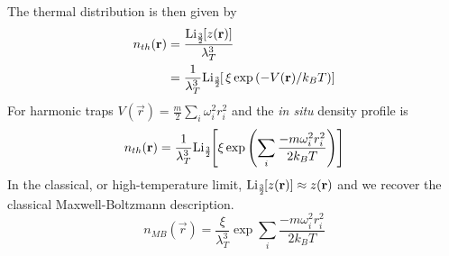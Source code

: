 The thermal distribution is then given by
\begin{equation}
	\begin{split}
	n_{th}(\mathbf{r}) &= \frac{\text{Li}_{\scriptscriptstyle\frac{3}{2}\!}\!\left[ z(\mathbf{r}) \right]}{\lambda_T^3} \\
				 &= \frac{1}{\lambda_T^3}\text{Li}_{\scriptscriptstyle\frac{3}{2}\!}\!\left[ \,\xi\,\text{exp}\left( {-V(\mathbf{r})/k_BT} \right) \right]
	\end{split}
\end{equation}
For harmonic traps $V(\vec{r}) = \frac{m}{2}\displaystyle\sum_i\omega_i^2r_i^2$ and the \textit{in situ} density profile is
\begin{equation} \label{eq:harmTrapDist}
	n_{th}(\mathbf{r}) = \frac{1}{\lambda_T^3}\text{Li}_{\scriptscriptstyle\frac{3}{2}\!}\!\left[ \xi \,\text{exp}\left( {\sum_i\frac{-m\omega_i^2r_i^2}{2 k_B T}} \right) \right]
\end{equation}
In the classical, or high-temperature limit, $\text{Li}_{\scriptscriptstyle\frac{3}{2}\!}\!\left[ z(\mathbf{r}) \right] \approx z(\mathbf{r})$ and we recover the classical Maxwell-Boltzmann description.
\begin{equation}
	n_{MB}(\vec{r}) = \frac{\xi}{\lambda_T^3}\exp{\sum_i\frac{-m\omega_i^2r_i^2}{2 k_B T}}
\end{equation}

